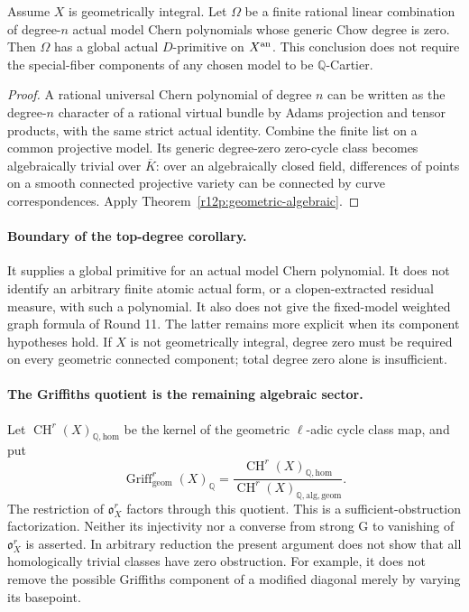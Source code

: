 \begin{corollary}
\label{r12p:top-degree}
Assume $X$ is geometrically integral.  Let $\Omega$ be a finite
rational linear combination of degree-$n$ actual model Chern
polynomials whose generic Chow degree is zero.  Then $\Omega$ has
a global actual $D$-primitive on $X^{\rm an}$.
This conclusion does not require the special-fiber components of
any chosen model to be $\mathbb Q$-Cartier.
\end{corollary}

\begin{proof}
A rational universal Chern polynomial of degree $n$ can be written
as the degree-$n$ character of a rational virtual bundle by Adams
projection and tensor products, with the same strict actual
identity.  Combine the finite list on a common projective model.
Its generic degree-zero zero-cycle class becomes algebraically
trivial over $\overline K$: over an algebraically closed field,
differences of points on a smooth connected projective variety can
be connected by curve correspondences.  Apply
Theorem~\ref{r12p:geometric-algebraic}.
\end{proof}

\paragraph{Boundary of the top-degree corollary.}
It supplies a global primitive for an actual model Chern polynomial.
It does not identify an arbitrary finite atomic actual form, or a
clopen-extracted residual measure, with such a polynomial.  It also
does not give the fixed-model weighted graph formula of Round 11.
The latter remains more explicit when its component hypotheses hold.
If $X$ is not geometrically integral, degree zero must be required
on every geometric connected component; total degree zero alone is
insufficient.

\paragraph{The Griffiths quotient is the remaining algebraic sector.}
Let $\operatorname{CH}^r(X)_{\mathbb Q,\mathrm{hom}}$ be the kernel
of the geometric $\ell$-adic cycle class map, and put
\[
 \operatorname{Griff}^r_{\mathrm{geom}}(X)_{\mathbb Q}
 =\frac{\operatorname{CH}^r(X)_{\mathbb Q,\mathrm{hom}}}
 {\operatorname{CH}^r(X)_{\mathbb Q,\mathrm{alg,geom}}}.
\]
The restriction of $\mathfrak o_X^r$ factors through this quotient.
This is a sufficient-obstruction factorization.  Neither its
injectivity nor a converse from strong G to vanishing of
$\mathfrak o_X^r$ is asserted.  In arbitrary reduction the present
argument does not show that all homologically trivial classes have
zero obstruction.  For example, it does not remove the possible
Griffiths component of a modified diagonal merely by varying its
basepoint.

